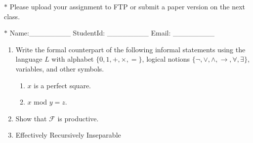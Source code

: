 \documentclass[12pt,a4paper]{article}
\theoremstyle{definition}
\numberwithin{equation}{section}
\numberwithin{figure}{section}
\begin{document}
\noindent

\noindent{}
\begin{center}
\footnotesize{\color{red}$*$ Please upload your assignment to FTP or submit a paper version on the next class.}

\footnotesize{\color{blue}$*$ Name:\_\_\_\_\_\_\_\_ \quad StudentId: \_\_\_\_\_\_\_\_ \quad Email: \_\_\_\_\_\_\_\_}
\end{center}

\begin{enumerate}
  \item Write the formal counterpart of the following informal statements using the language $L$ with alphabet $\{0,1,+,\times,=\}$, logical notions $\{\neg, \vee, \wedge, \rightarrow, \forall, \exists\}$, variables, and other symbols.
     \begin{enumerate}
     	\item $x$ is a perfect square.
     	\item $x$ mod $y = z$.
     \end{enumerate}
  \item Show that $\mathscr{F}$ is productive.

  \item Effectively Recursively Inseparable


\end{enumerate}
\end{document}
